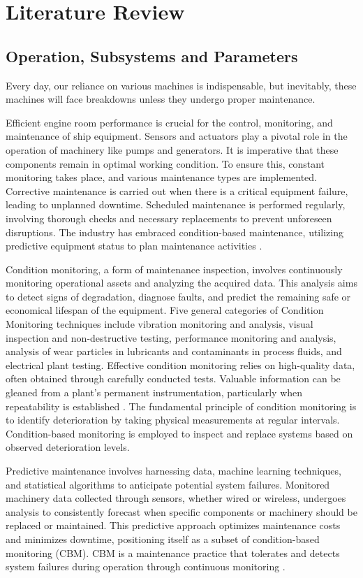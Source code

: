 \section{Literature Review}
\subsection{Operation, Subsystems and Parameters}
Every day, our reliance on various machines is indispensable, but inevitably, these machines will face breakdowns unless they undergo proper maintenance.

Efficient engine room performance is crucial for the control, monitoring, and maintenance of ship equipment. Sensors and actuators play a pivotal role in the operation of machinery like pumps and generators. It is imperative that these components remain in optimal working condition. To ensure this, constant monitoring takes place, and various maintenance types are implemented. Corrective maintenance is carried out when there is a critical equipment failure, leading to unplanned downtime. Scheduled maintenance is performed regularly, involving thorough checks and necessary replacements to prevent unforeseen disruptions. The industry has embraced condition-based maintenance, utilizing predictive equipment status to plan maintenance activities \cite{noauthor_predictive_nodate}.

Condition monitoring, a form of maintenance inspection, involves continuously monitoring operational assets and analyzing the acquired data. This analysis aims to detect signs of degradation, diagnose faults, and predict the remaining safe or economical lifespan of the equipment. Five general categories of Condition Monitoring techniques include vibration monitoring and analysis, visual inspection and non-destructive testing, performance monitoring and analysis, analysis of wear particles in lubricants and contaminants in process fluids, and electrical plant testing. Effective condition monitoring relies on high-quality data, often obtained through carefully conducted tests. Valuable information can be gleaned from a plant's permanent instrumentation, particularly when repeatability is established \cite{lu_condition_2018}. The fundamental principle of condition monitoring is to identify deterioration by taking physical measurements at regular intervals. Condition-based monitoring is employed to inspect and replace systems based on observed deterioration levels. 

Predictive maintenance involves harnessing data, machine learning techniques, and statistical algorithms to anticipate potential system failures. Monitored machinery data collected through sensors, whether wired or wireless, undergoes analysis to consistently forecast when specific components or machinery should be replaced or maintained. This predictive approach optimizes maintenance costs and minimizes downtime, positioning itself as a subset of condition-based monitoring (CBM). CBM is a maintenance practice that tolerates and detects system failures during operation through continuous monitoring \cite{kimera_predictive_2020}.

